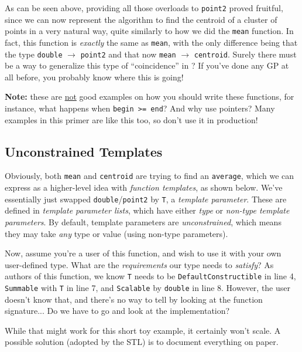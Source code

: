 

\noindent As can be seen above, providing all those overloads to \texttt{point2} proved fruitful, since we can now represent the algorithm to find the centroid of a cluster of points in a very natural way, quite similarly to how we did the \texttt{mean} function. In fact, this function is \emph{exactly} the same as \texttt{mean}, with the only difference being that the type \texttt{double} $\rightarrow$ \texttt{point2} and that now \texttt{mean} $\rightarrow$ \texttt{centroid}. Surely there must be a way to generalize this type of ``coincidence'' in \Cpp? If you've done any GP at all before, you probably know where this is going!

\vspace{1em}\noindent\textbf{Note:} these are \underline{not} good examples on how you should write these functions, for instance, what happens when \texttt{begin >= end}? And why use pointers? Many examples in this primer are like this too, so don't use it in production!

\subsection{Unconstrained Templates} \label{sec:unconstrained_templates}

    Obviously, both \texttt{mean} and \texttt{centroid} are trying to find an \texttt{average}, which we can express as a higher-level idea with \emph{function templates}, as shown below. We've essentially just swapped \texttt{double}/\texttt{point2} by \texttt{T}, a \emph{template parameter}. These are defined in \emph{template parameter lists}, which have either \emph{type} or \emph{non-type template parameters}. By default, template parameters are \emph{unconstrained}, which means they may take \emph{any} type or value (using non-type parameters).

    Now, assume you're a user of this function, and wish to use it with your own user-defined type. What are the \emph{requirements} our type needs to \emph{satisfy}? As authors of this function, we know \texttt{T} needs to be \texttt{DefaultConstructible} in line 4, \texttt{Summable} with \texttt{T} in line 7, and \texttt{Scalable} by \texttt{double} in line 8. However, the user doesn't know that, and there's no way to tell by looking at the function signature... Do we have to go and look at the implementation?

    While that might work for this short toy example, it certainly won't scale. A possible solution (adopted by the STL) is to document everything on paper.

